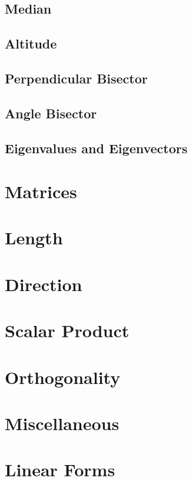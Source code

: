 \documentclass[journal]{IEEEtran}
\begin{document}
\subsection{Median}

\newpage
\subsection{Altitude}

\newpage
\subsection{Perpendicular Bisector}

\newpage
\subsection{Angle Bisector}

\newpage
\subsection{Eigenvalues and Eigenvectors}

\newpage
\section{Matrices}

\newpage
\section{Length}

%
\section{Direction}

\section{Scalar Product}

\section{Orthogonality}

\section{Miscellaneous}
%
\section{Linear Forms}
\end{document}
